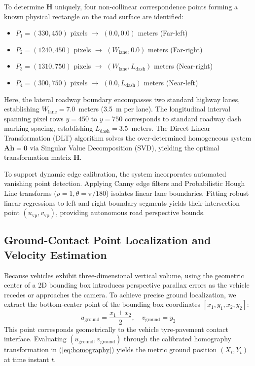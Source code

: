 \documentclass[conference]{IEEEtran}
\begin{document}
To determine $\mathbf{H}$ uniquely, four non-collinear correspondence points forming a known physical rectangle on the road surface are identified:
\begin{itemize}
    \item[\textit{i)}] $P_1 = (330, 450)$ pixels $\rightarrow$ $(0.0, 0.0)$ meters (Far-left)
    \item[\textit{ii)}] $P_2 = (1240, 450)$ pixels $\rightarrow$ $(W_{\text{lane}}, 0.0)$ meters (Far-right)
    \item[\textit{iii)}] $P_3 = (1310, 750)$ pixels $\rightarrow$ $(W_{\text{lane}}, L_{\text{dash}})$ meters (Near-right)
    \item[\textit{iv)}] $P_4 = (300, 750)$ pixels $\rightarrow$ $(0.0, L_{\text{dash}})$ meters (Near-left)
\end{itemize}
Here, the lateral roadway boundary encompasses two standard highway lanes, establishing $W_{\text{lane}} = 7.0$~meters (3.5~m per lane). The longitudinal interval spanning pixel rows $y=450$ to $y=750$ corresponds to standard roadway dash marking spacing, establishing $L_{\text{dash}} = 3.5$~meters. The Direct Linear Transformation (DLT) algorithm solves the over-determined homogeneous system $\mathbf{A} \mathbf{h} = \mathbf{0}$ via Singular Value Decomposition (SVD), yielding the optimal transformation matrix $\mathbf{H}$.

To support dynamic edge calibration, the system incorporates automated vanishing point detection. Applying Canny edge filters and Probabilistic Hough Line transforms ($\rho=1, \theta=\pi/180$) isolates linear lane boundaries. Fitting robust linear regressions to left and right boundary segments yields their intersection point $(u_{\text{vp}}, v_{\text{vp}})$, providing autonomous road perspective bounds.

\subsection{Ground-Contact Point Localization and Velocity Estimation}
Because vehicles exhibit three-dimensional vertical volume, using the geometric center of a 2D bounding box introduces perspective parallax errors as the vehicle recedes or approaches the camera. To achieve precise ground localization, we extract the bottom-center point of the bounding box coordinates $[x_1, y_1, x_2, y_2]$:
\begin{equation}
u_{\text{ground}} = \frac{x_1 + x_2}{2}, \quad v_{\text{ground}} = y_2
\label{eq:ground_contact}
\end{equation}
This point corresponds geometrically to the vehicle tyre-pavement contact interface. Evaluating $(u_{\text{ground}}, v_{\text{ground}})$ through the calibrated homography transformation in (\ref{eq:homography}) yields the metric ground position $(X_t, Y_t)$ at time instant $t$.
\end{document}
